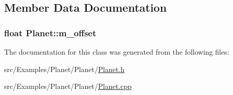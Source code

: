 \subsection{Member Data Documentation}
\hypertarget{class_planet_a6886b414f3571371259ef5bc7db4e26d}{
\subsubsection[{m\+\_\+offset}]{\setlength{\rightskip}{0pt plus 5cm}float Planet\+::m\+\_\+offset}}\label{class_planet_a6886b414f3571371259ef5bc7db4e26d}


The documentation for this class was generated from the following files\+:\begin{DoxyCompactItemize}
\item 
src/\+Examples/\+Planet/\+Planet/\hyperlink{_planet_8h}{Planet.\+h}\item 
src/\+Examples/\+Planet/\+Planet/\hyperlink{_planet_8cpp}{Planet.\+cpp}\end{DoxyCompactItemize}
